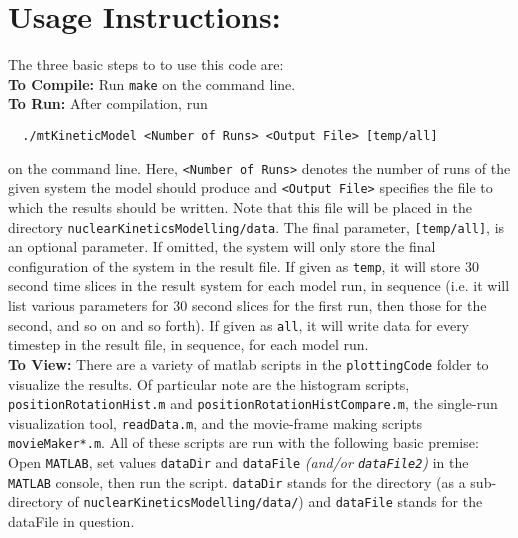 \documentclass{article}
\begin{document}
\section{Usage Instructions:}
  The three basic steps to to use this code are:\\
  \textbf{To Compile:} Run \texttt{make} on the command line.\\
  \textbf{To Run:} After compilation, run
  \begin{verbatim}
  ./mtKineticModel <Number of Runs> <Output File> [temp/all]
  \end{verbatim}
  on the command line. Here, \texttt{<Number of Runs>} denotes the number of
  runs of the given system the model should produce and \texttt{<Output File>}
  specifies the file to which the results should be written. Note that this file
  will be placed in the directory \texttt{nuclearKineticsModelling/data}. The
  final parameter, \texttt{[temp/all]}, is an optional parameter. If omitted,
  the system will only store the final configuration of the system in the result
  file. If given as \texttt{temp}, it will store 30 second time slices in the
  result system for each model run, in sequence (i.e. it will list various
  parameters for 30 second slices for the first run, then those for the second,
  and so on and so forth). If given as \texttt{all}, it will write data for
  every timestep in the result file, in sequence, for each model run. \\
  \textbf{To View: } There are a variety of matlab scripts in the
  \texttt{plottingCode} folder to visualize the results. Of particular note are
  the histogram scripts, \texttt{positionRotationHist.m} and
  \texttt{positionRotationHistCompare.m}, the single-run visualization tool,
  \texttt{readData.m}, and the movie-frame making scripts
  \texttt{movieMaker*.m}. All of these scripts are run with the following basic
  premise: Open \texttt{MATLAB}, set values \texttt{dataDir} and
  \texttt{dataFile} \textit{(and/or \texttt{dataFile2})} in the \texttt{MATLAB}
  console, then run the script. \texttt{dataDir} stands for the directory (as a
  sub-directory of \texttt{nuclearKineticsModelling/data/}) and
  \texttt{dataFile} stands for the dataFile in question. 
\end{document}
